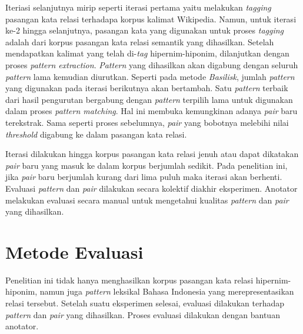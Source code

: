 Iteriasi selanjutnya mirip seperti iterasi pertama yaitu melakukan \textit{tagging} pasangan kata relasi terhadapa korpus kalimat Wikipedia. Namun, untuk iterasi ke-2 hingga selanjutnya, pasangan kata yang digunakan untuk proses \textit{tagging} adalah dari korpus pasangan kata relasi semantik yang dihasilkan. Setelah mendapatkan kalimat yang telah di-\textit{tag} hipernim-hiponim, dilanjutkan dengan proses \textit{pattern extraction}. \textit{Pattern} yang dihasilkan akan digabung dengan seluruh \textit{pattern} lama kemudian diurutkan. Seperti pada metode \textit{Basilisk}, jumlah \textit{pattern} yang digunakan pada iterasi berikutnya akan bertambah. Satu \textit{pattern} terbaik dari hasil pengurutan bergabung dengan \textit{pattern} terpilih lama untuk digunakan dalam proses \textit{pattern matching}. Hal ini membuka kemungkinan adanya \textit{pair} baru terekstrak. Sama seperti proses sebelumnya, \textit{pair} yang bobotnya melebihi nilai \textit{threshold} digabung ke dalam \noindent pasangan kata relasi.

Iterasi dilakukan hingga korpus pasangan kata relasi jenuh atau dapat dikatakan \textit{pair} baru yang masuk ke dalam korpus berjumlah sedikit. Pada penelitian ini, jika \textit{pair} baru berjumlah kurang dari lima puluh maka iterasi akan berhenti. Evaluasi \textit{pattern} dan \textit{pair} dilakukan secara kolektif diakhir eksperimen. Anotator melakukan evaluasi secara manual untuk mengetahui kualitas \textit{pattern} dan \textit{pair} yang dihasilkan.


\section{Metode Evaluasi}
Penelitian ini tidak hanya menghasilkan korpus pasangan kata relasi hipernim-hiponim, namun juga \textit{pattern} leksikal Bahasa Indonesia yang merepresentasikan relasi tersebut. Setelah suatu eksperimen selesai, evaluasi dilakukan terhadap \textit{pattern} dan \textit{pair} yang dihasilkan. Proses evaluasi dilakukan dengan bantuan anotator.

